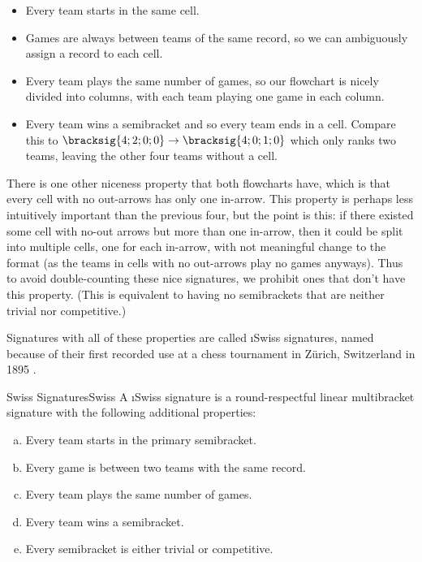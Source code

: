 {    \begin{itemize}
        \item Every team starts in the same cell.
        \item Games are always between teams of the same record, so we can ambiguously assign a record to each cell.
        \item Every team plays the same number of games, so our flowchart is nicely divided into columns, with each team playing one game in each column.
        \item Every team wins a semibracket and so every team ends in a cell. Compare this to $\bracksig{4;2;0;0} \to \bracksig{4;0;1;0}$ which only ranks two teams, leaving the other four teams without a cell.
    \end{itemize}

    There is one other niceness property that both flowcharts have, which is that every cell with no out-arrows has only one in-arrow. This property is perhaps less intuitively important than the previous four, but the point is this: if there existed some cell with no-out arrows but more than one in-arrow, then it could be split into multiple cells, one for each in-arrow, with not meaningful change to the format (as the teams in cells with no out-arrows play no games anyways). Thus to avoid double-counting these nice signatures, we prohibit ones that don't have this property. (This is equivalent to having no semibrackets that are neither trivial nor competitive.)

    Signatures with all of these properties are called \i{Swiss signatures}, named because of their first recorded use at a chess tournament in Zürich, Switzerland in 1895 \cite{info_swiss}.

    \begin{definition}{Swiss Signatures}{Swiss}
        A \i{Swiss signature} is a round-respectful linear multibracket signature with the following additional properties:
        \begin{enumerate}[(a)]
            \item Every team starts in the primary semibracket.
            \item Every game is between two teams with the same record.
            \item Every team plays the same number of games.
            \item Every team wins a semibracket.
            \item Every semibracket is either trivial or competitive.
        \end{enumerate}
    \end{definition}

}
